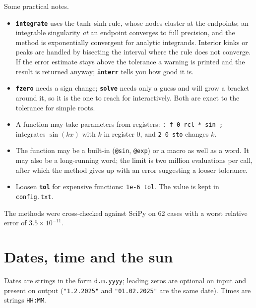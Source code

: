 \documentclass[11pt,letterpaper]{article}
\newcommand{\code}[1]{\texttt{#1}}
\newcommand{\cmd}[1]{\texttt{\textbf{#1}}}
\begin{document}
Some practical notes.
\begin{itemize}
  \item \cmd{integrate} uses the tanh--sinh rule, whose nodes cluster at the endpoints; an integrable singularity \emph{at} an endpoint converges to full precision, and the method is exponentially convergent for analytic integrands. Interior kinks or peaks are handled by bisecting the interval where the rule does not converge. If the error estimate stays above the tolerance a warning is printed and the result is returned anyway; \cmd{interr} tells you how good it is.
  \item \cmd{fzero} needs a sign change; \cmd{solve} needs only a guess and will grow a bracket around it, so it is the one to reach for interactively. Both are exact to the tolerance for simple roots.
  \item A function may take parameters from registers: \code{: f 0 rcl * sin ;} integrates $\sin(kx)$ with $k$ in register 0, and \code{2 0 sto} changes $k$.
  \item The function may be a built-in (\code{@sin}, \code{@exp}) or a macro as well as a word. It may also be a long-running word; the limit is two million evaluations per call, after which the method gives up with an error suggesting a looser tolerance.
  \item Loosen \cmd{tol} for expensive functions: \code{1e-6 tol}. The value is kept in \code{config.txt}.
\end{itemize}
The methods were cross-checked against SciPy on 62 cases with a worst relative error of $3.5\times10^{-11}$.

\section{Dates, time and the sun}

Dates are strings in the form \code{d.m.yyyy}; leading zeros are optional on input and present on output (\code{"1.2.2025"} and \code{"01.02.2025"} are the same date). Times are strings \code{HH:MM}.
\end{document}

